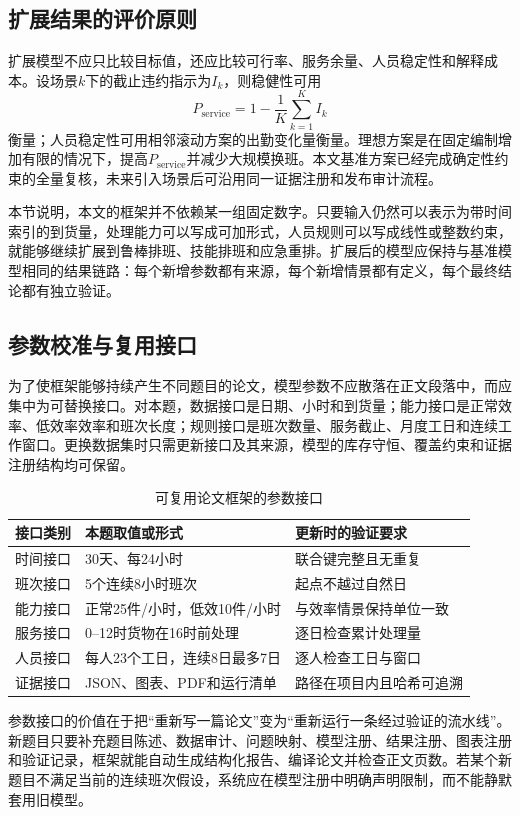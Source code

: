\subsection{扩展结果的评价原则}

扩展模型不应只比较目标值，还应比较可行率、服务余量、人员稳定性和解释成本。设场景$k$下的截止违约指示为$I_k$，则稳健性可用
\begin{equation}
 P_{\mathrm{service}}=1-\frac{1}{K}\sum_{k=1}^{K}I_k
\end{equation}
衡量；人员稳定性可用相邻滚动方案的出勤变化量衡量。理想方案是在固定编制增加有限的情况下，提高$P_{\mathrm{service}}$并减少大规模换班。本文基准方案已经完成确定性约束的全量复核，未来引入场景后可沿用同一证据注册和发布审计流程。

本节说明，本文的框架并不依赖某一组固定数字。只要输入仍然可以表示为带时间索引的到货量，处理能力可以写成可加形式，人员规则可以写成线性或整数约束，就能够继续扩展到鲁棒排班、技能排班和应急重排。扩展后的模型应保持与基准模型相同的结果链路：每个新增参数都有来源，每个新增情景都有定义，每个最终结论都有独立验证。

\clearpage
\subsection{参数校准与复用接口}

为了使框架能够持续产生不同题目的论文，模型参数不应散落在正文段落中，而应集中为可替换接口。对本题，数据接口是日期、小时和到货量；能力接口是正常效率、低效率效率和班次长度；规则接口是班次数量、服务截止、月度工日和连续工作窗口。更换数据集时只需更新接口及其来源，模型的库存守恒、覆盖约束和证据注册结构均可保留。

\begin{table}[htbp]
\centering
\caption{可复用论文框架的参数接口}
\label{tab:parameter-interface}
\begin{tabular}{p{}p{}p{}}
\toprule
接口类别 & 本题取值或形式 & 更新时的验证要求\\
\midrule
时间接口 & 30天、每24小时 & 联合键完整且无重复\\
班次接口 & 5个连续8小时班次 & 起点不越过自然日\\
能力接口 & 正常25件/小时，低效10件/小时 & 与效率情景保持单位一致\\
服务接口 & 0--12时货物在16时前处理 & 逐日检查累计处理量\\
人员接口 & 每人23个工日，连续8日最多7日 & 逐人检查工日与窗口\\
证据接口 & JSON、图表、PDF和运行清单 & 路径在项目内且哈希可追溯\\
\bottomrule
\end{tabular}
\end{table}

参数接口的价值在于把“重新写一篇论文”变为“重新运行一条经过验证的流水线”。新题目只要补充题目陈述、数据审计、问题映射、模型注册、结果注册、图表注册和验证记录，框架就能自动生成结构化报告、编译论文并检查正文页数。若某个新题目不满足当前的连续班次假设，系统应在模型注册中明确声明限制，而不能静默套用旧模型。

